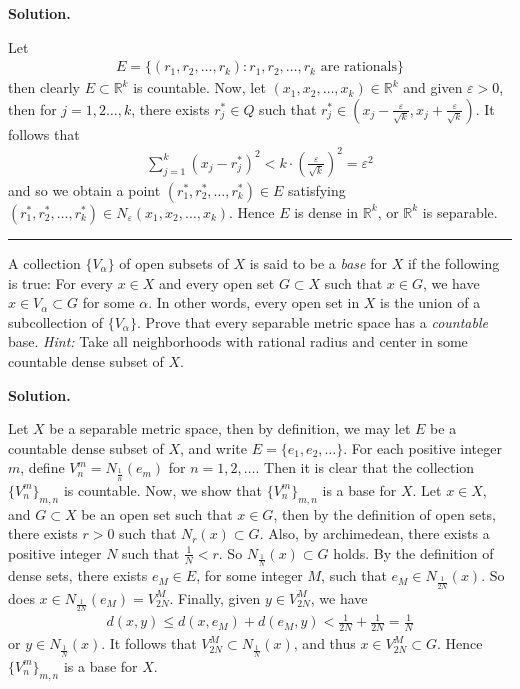 \documentclass[12pt]{article}
\theoremstyle{definition}
\begin{document}
\smallskip
\noindent\textbf{Solution.}\quad

Let
\begin{align*}
E=\{(r_1,r_2,\ldots,r_k): r_1,r_2,\ldots,r_k\mbox{ are rationals}\}
\end{align*}
then clearly $E\subset \mathbb{R}^k$ is countable. Now, let $(x_1,x_2,\ldots,x_k)\in \mathbb{R}^k$ and given $\varepsilon>0$, then for $j=1,2\ldots,k$, there exists $r_j^\ast\in Q$ such that $r_j^\ast\in\left(x_j-\tfrac{\varepsilon}{\sqrt{k}},x_j+\tfrac{\varepsilon}{\sqrt{k}}\right)$. It follows that
\begin{align*}
\sum_{j=1}^k\left(x_j-r_j^\ast\right)^2
<k\cdot\left(\frac{\varepsilon}{\sqrt{k}}\right)^2
=\varepsilon^2
\end{align*}
and so we obtain a point $(r_1^\ast,r_2^\ast,\ldots,r_k^\ast)\in E$ satisfying $(r_1^\ast,r_2^\ast,\ldots,r_k^\ast)\in N_\varepsilon(x_1,x_2,\ldots,x_k)$. Hence $E$ is dense in $\mathbb{R}^k$, or $\mathbb{R}^k$ is separable.



\bigskip\noindent\hrule\bigskip

A collection $\{V_\alpha\}$ of open subsets of $X$ is said to be a \textit{base} for $X$ if the following is true: For every $x\in X$ and every open set $G\subset X$ such that $x\in G$, we have $x\in V_\alpha\subset G$ for some $\alpha$. In other words, every open set in $X$ is the union of a subcollection of $\{V_\alpha\}$.
Prove that every separable metric space has a \textit{countable} base. \textit{Hint:} Take all neighborhoods with rational radius and center in some countable dense subset of $X$.

\smallskip
\noindent\textbf{Solution.}\quad

Let $X$ be a separable metric space, then by definition, we may let $E$ be a countable dense subset of $X$, and write $E=\{e_1,e_2,\ldots\}$. For each positive integer $m$, define $V_n^m=N_{\tfrac{1}{n}}(e_m)$ for $n=1,2,\ldots$. Then it is clear that the collection $\{V_n^m\}_{m,n}$ is countable. Now, we show that $\{V_n^m\}_{m,n}$ is a base for $X$. Let $x\in X$, and $G\subset X$ be an open set such that $x\in G$, then by the definition of open sets, there exists $r>0$ such that $N_r(x)\subset G$. Also, by archimedean, there exists a positive integer $N$ such that $\frac{1}{N}<r$. So $N_{\tfrac{1}{N}}(x)\subset G$ holds. By the definition of dense sets, there exists $e_M\in E$, for some integer $M$, such that $e_M\in N_{\tfrac{1}{2N}}(x)$. So does $x\in N_{\tfrac{1}{2N}}(e_M)=V_{2N}^M$. Finally, given $y\in V_{2N}^M$, we have
\begin{align*}
d(x,y)
\le d(x,e_M)+d(e_M,y)
<\frac{1}{2N}+\frac{1}{2N}
=\frac{1}{N}
\end{align*}
or $y\in N_{\tfrac{1}{N}}(x)$. It follows that $V_{2N}^M\subset N_{\tfrac{1}{N}}(x)$, and thus $x\in V_{2N}^M\subset G$. Hence $\{V_n^m\}_{m,n}$ is a base for $X$.
\end{document}

